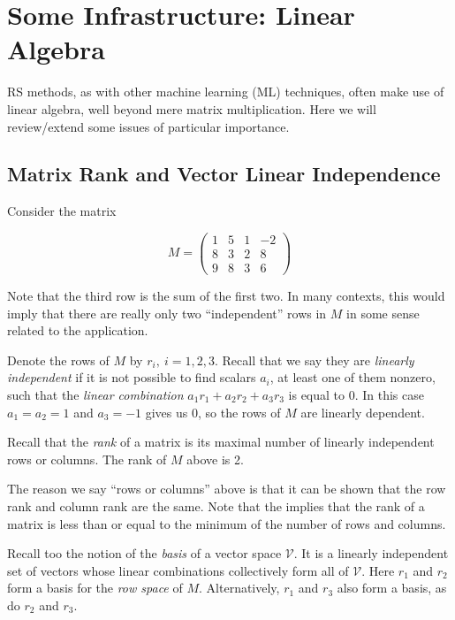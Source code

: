 \chapter{Some Infrastructure: Linear Algebra}  
\label{chap:linalg}  

RS methods, as with other machine learning (ML) techniques, often make
use of linear algebra, well beyond mere matrix multiplication.  Here we
will review/extend some issues of particular importance.

\section{Matrix Rank and Vector Linear Independence}

Consider the matrix

\begin{equation}
\label{rankex1}
M = 
\left (
\begin{array}{rrrr}
1 & 5 & 1 & -2 \\
8 & 3 & 2 & 8 \\
9 & 8 & 3 & 6 
\end{array}
\right )
\end{equation}

Note that the third row is the sum of the first two.  In many contexts,
this would imply that there are really only two ``independent'' rows in
$M$ in some sense related to the application.  

Denote the rows of $M$ by $r_i, ~ i = 1,2,3$.  Recall that we say they
are \textit{linearly independent} if it is not possible to find scalars
$a_i$, at least one of them nonzero, such that the \textit{linear
combination} $a_1 r_1 + a_2 r_2 + a_3 r_3$ is equal to 0.  In this case
$a_1 = a_2 = 1$ and $a_3 = -1$ gives us 0, so the rows of $M$ are
linearly dependent.

Recall that the \textit{rank} of a matrix is its maximal number of
linearly independent rows or columns.  The rank of $M$ above is 2.

The reason we say ``rows or columns'' above is that it can be shown that
the row rank and column rank are the same.  Note that the implies that
the rank of a matrix is less than or equal to the minimum of the number
of rows and columns.

Recall too the notion of the \textit{basis} of a vector space
$\mathcal{V}$.  It is a linearly independent set of vectors whose linear
combinations collectively form all of $\mathcal{V}$.  Here  $r_1$ and
$r_2$ form a basis for the \textit{row space} of $M$.  Alternatively,
$r_1$ and $r_3$ also form a basis, as do $r_2$ and $r_3$.

